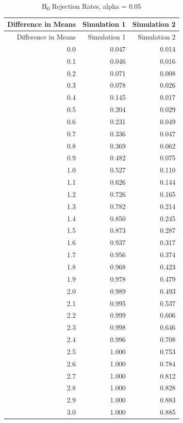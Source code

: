 \documentclass[]{article}
\begin{document}
\begin{longtable}[]{@{}rrr@{}}
\caption{H\textsubscript{0} Rejection Rates, alpha =
0.05}\tabularnewline
\toprule
Difference in Means & Simulation 1 & Simulation 2\tabularnewline
\midrule
\endfirsthead
\toprule
Difference in Means & Simulation 1 & Simulation 2\tabularnewline
\midrule
\endhead
0.0 & 0.047 & 0.014\tabularnewline
0.1 & 0.046 & 0.016\tabularnewline
0.2 & 0.071 & 0.008\tabularnewline
0.3 & 0.078 & 0.026\tabularnewline
0.4 & 0.145 & 0.017\tabularnewline
0.5 & 0.204 & 0.029\tabularnewline
0.6 & 0.231 & 0.049\tabularnewline
0.7 & 0.336 & 0.047\tabularnewline
0.8 & 0.369 & 0.062\tabularnewline
0.9 & 0.482 & 0.075\tabularnewline
1.0 & 0.527 & 0.110\tabularnewline
1.1 & 0.626 & 0.144\tabularnewline
1.2 & 0.726 & 0.165\tabularnewline
1.3 & 0.782 & 0.214\tabularnewline
1.4 & 0.850 & 0.245\tabularnewline
1.5 & 0.873 & 0.287\tabularnewline
1.6 & 0.937 & 0.317\tabularnewline
1.7 & 0.956 & 0.374\tabularnewline
1.8 & 0.968 & 0.423\tabularnewline
1.9 & 0.978 & 0.479\tabularnewline
2.0 & 0.989 & 0.493\tabularnewline
2.1 & 0.995 & 0.537\tabularnewline
2.2 & 0.999 & 0.606\tabularnewline
2.3 & 0.998 & 0.646\tabularnewline
2.4 & 0.996 & 0.708\tabularnewline
2.5 & 1.000 & 0.753\tabularnewline
2.6 & 1.000 & 0.784\tabularnewline
2.7 & 1.000 & 0.812\tabularnewline
2.8 & 1.000 & 0.828\tabularnewline
2.9 & 1.000 & 0.883\tabularnewline
3.0 & 1.000 & 0.885\tabularnewline
\bottomrule
\end{longtable}
\end{document}

